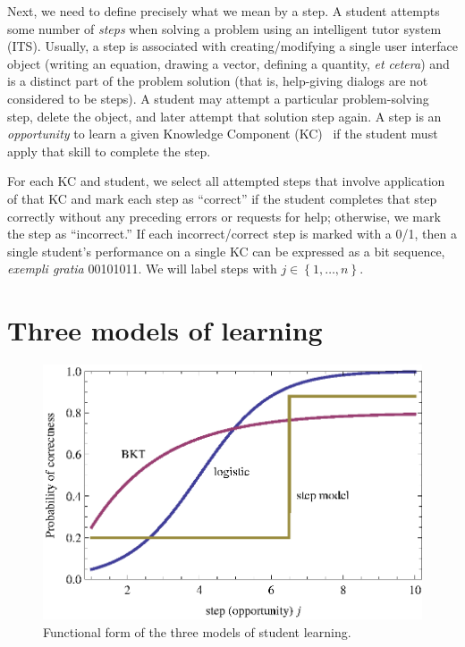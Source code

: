 \documentclass{edm_template}
\begin{document}
Next,  we need to define
precisely what we mean by a step.
A student attempts some number of {\em steps} when solving a problem
using an intelligent tutor system (ITS).
Usually, a step is associated with creating/modifying a single user
interface object (writing an equation, drawing a vector, defining a
quantity, {\em et cetera}) and is a distinct part of the problem
solution (that is, help-giving dialogs are not considered to be
steps).  A student may attempt a particular problem-solving step,
delete the object, and later attempt that solution step again.  A step
is an {\em opportunity} to learn a given Knowledge Component
(KC)~\cite{vanlehn_behavior_2006} if the student must apply that skill
to complete the step.

%
%

For each KC and student, we select all attempted steps that involve application
of that KC and mark each step as ``correct'' if
the student completes that step correctly without any preceding errors or 
requests for help; otherwise, we mark the step as ``incorrect.''
\label{steps}  %
If each incorrect/correct step is marked with a 0/1, then
a single student's performance on a single KC can be expressed as a bit  sequence,
{\em exempli gratia} 00101011.  We will label
steps with $j\in\left\{1,\ldots,n\right\}$.  

\section{Three models of learning}

\begin{figure}
  \centering \includegraphics{three-models.eps}
  \caption{Functional form of the three models of student learning.}
    \label{three-models}
\end{figure}
\end{document}
